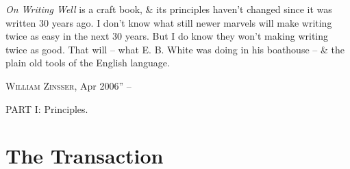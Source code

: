 \documentclass[oneside]{book}
\numberwithin{equation}{section}
\begin{document}
\textit{On Writing Well} is a craft book, \& its principles haven't changed since it was written 30 years ago. I don't know what still newer marvels will make writing twice as easy in the next 30 years. But I do know they won't making writing twice as good. That will  -- what E. B. White was doing in his boathouse -- \& the plain old tools of the English language.
\begin{flushright}
	\textsc{William Zinsser}, Apr 2006'' -- \cite[pp. 5--8]{Zinsser2016}
\end{flushright}

\begin{center}
	\LARGE PART I: Principles.
\end{center}

\section{The Transaction}
\end{document}

